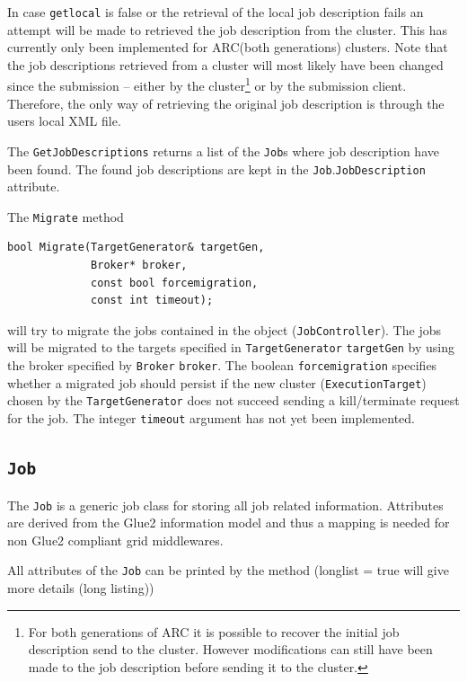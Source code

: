 \documentclass{book}
\newcommand{\Broker}{\texttt{Broker}}
\newcommand{\ExecutionTarget}{\texttt{ExecutionTarget}}
\newcommand{\Job}{\texttt{Job}}
\newcommand{\JobController}{\texttt{JobController}}
\newcommand{\TargetGenerator}{\texttt{TargetGenerator}}
\begin{document}
In case \texttt{getlocal} is false or the retrieval of the local job description 
fails an attempt will be made to retrieved the job description from the cluster. This has 
currently only been implemented for ARC(both generations) clusters. Note 
that the job descriptions retrieved from a cluster will most likely have 
been changed since the submission -- either by the cluster\footnote{For both 
generations of ARC it is possible to recover the initial job description send 
to the cluster. However modifications can still have been made to the 
job description before sending it to the cluster.} or by the submission 
client. Therefore, the only way of retrieving the original job description is 
through the users local XML file.

The \texttt{GetJobDescriptions} returns a list of the  {\Job}s where job description 
have been found. The found job descriptions are kept in the 
{\Job}.\texttt{JobDescription} attribute.

The \texttt{Migrate} method
\begin{shaded}
\begin{verbatim}
bool Migrate(TargetGenerator& targetGen,
             Broker* broker,
             const bool forcemigration,
             const int timeout);
\end{verbatim}
\end{shaded}
will try to migrate the jobs contained in the object ({\JobController}). The jobs
will be migrated to the targets specified in {\TargetGenerator} \texttt{targetGen}
by using the broker specified by {\Broker} \texttt{broker}. The boolean
\texttt{forcemigration} specifies whether a migrated job should persist if the
new cluster ({\ExecutionTarget}) chosen by the {\TargetGenerator} does not
succeed sending a kill/terminate request for the job. The integer
\texttt{timeout} argument has not yet been implemented.



\subsection{{\Job}}

The {\Job} is a generic job class for storing all job related
information. Attributes are derived from the Glue2 information model
and thus a mapping is needed for non Glue2 compliant grid middlewares.

All attributes of the {\Job} can be printed by the method (longlist = true 
will give more details (long listing))
\end{document}
